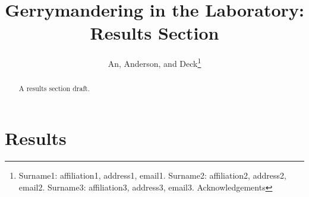 \documentclass[AER]{AEA}
\begin{document}
\title{Gerrymandering in the Laboratory: Results Section}
\author{An,  Anderson, and Deck\thanks{Surname1: affiliation1, address1, email1. 
Surname2: affiliation2, address2, email2. Surname3: affiliation3, address3, email3. Acknowledgements}}

\begin{abstract}
A results section draft.
\end{abstract}


\maketitle

%
%
%
%
%
%
%
%
%
%

\section{Results}
\label{section:results}
\end{document}

